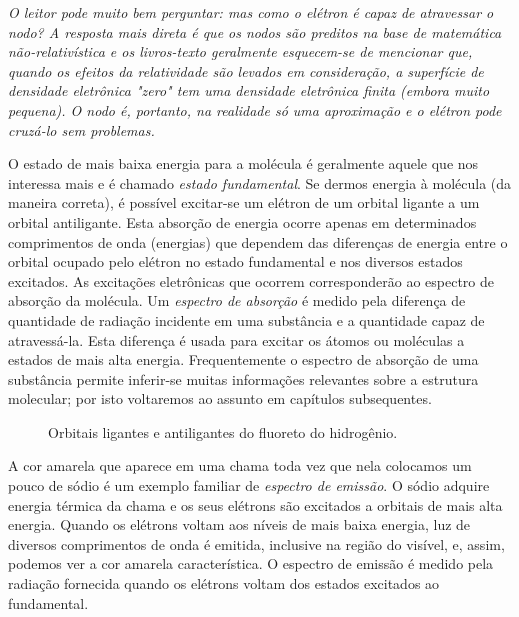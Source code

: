 \par\bigskip
\noindent\emph{O leitor pode muito bem perguntar: mas como o elétron é capaz de atravessar o nodo? A resposta mais direta é que os nodos são preditos na base de matemática não-relativística e os livros-texto geralmente esquecem-se de mencionar que, quando os efeitos da relatividade são levados em consideração, a superfície de densidade eletrônica "zero" tem uma densidade eletrônica finita (embora muito pequena). O nodo é, portanto, na realidade só uma aproximação e o elétron pode cruzá-lo sem problemas.}
\par\bigskip

O estado de mais baixa energia para a molécula é geralmente aquele que nos interessa mais e é chamado \textit{estado fundamental}. Se dermos energia à molécula (da maneira correta), é possível excitar-se um elétron de um orbital ligante a um orbital antiligante. Esta absorção de energia ocorre apenas em determinados comprimentos de onda (energias) que dependem das diferenças de energia entre o orbital ocupado pelo elétron no estado fundamental e nos diversos estados excitados. As excitações eletrônicas que ocorrem corresponderão ao espectro de absorção da molécula. Um \textit{espectro de absorção} é medido pela diferença de quantidade de radiação incidente em uma substância e a quantidade capaz de atravessá-la. Esta diferença é usada para excitar os átomos ou moléculas a estados de mais alta energia. Frequentemente o espectro de absorção de uma substância permite inferir-se muitas informações relevantes sobre a estrutura molecular; por isto voltaremos ao assunto em capítulos subsequentes. 

\begin{figure}[H]
    \centering
    \caption{Orbitais ligantes e antiligantes do fluoreto do hidrogênio.}
    \label{fig2_4}
\end{figure}

A cor amarela que aparece em uma chama toda vez que nela colocamos um pouco de sódio é um exemplo familiar de \textit{espectro de emissão}. O sódio adquire energia térmica da chama e os seus elétrons são excitados a orbitais de mais alta energia. Quando os elétrons voltam aos níveis de mais baixa energia, luz de diversos comprimentos de onda é emitida, inclusive na região do visível, e, assim, podemos ver a cor amarela característica. O espectro de emissão é medido pela radiação fornecida quando os elétrons voltam dos estados excitados ao fundamental.

